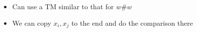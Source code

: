 \begin{frame}[allowframebreaks]
\begin{itemize}
\item [] Can use a TM similar to that for $w \# w$

\item We can copy $x_i, x_j$ to the end
  and do the comparison there
  





\end{itemize}\end{frame}




